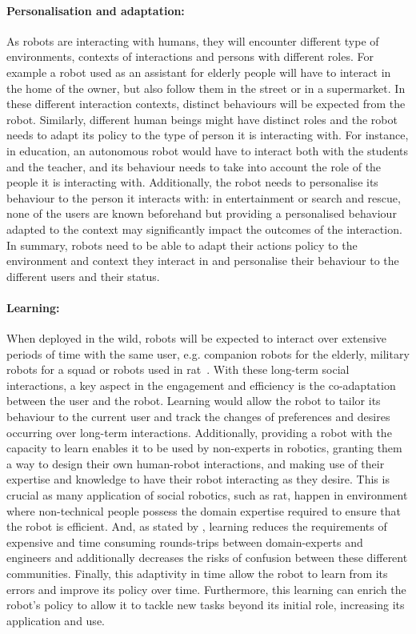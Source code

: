     \paragraph{Personalisation and adaptation: } As robots are interacting with humans, they will encounter different type of environments, contexts of interactions and persons with different roles. For example a robot used as an assistant for elderly people will have to interact in the home of the owner, but also follow them in the street or in a supermarket. In these different interaction contexts, distinct behaviours will be expected from the robot. Similarly, different human beings might have distinct roles and the robot needs to adapt its policy to the type of person it is interacting with. For instance, in education, an autonomous robot would have to interact both with the students and the teacher, and its behaviour needs to take into account the role of the people it is interacting with. Additionally, the robot needs to personalise its behaviour to the person it interacts with: in entertainment or search and rescue, none of the users are known beforehand but providing a personalised behaviour adapted to the context may significantly impact the outcomes of the interaction. In summary, robots need to be able to adapt their actions policy to the environment and context they interact in and personalise their behaviour to the different users and their status.

	\paragraph{Learning:} When deployed in the wild, robots will be expected to interact over extensive periods of time with the same user, e.g. companion robots for the elderly, military robots for a squad or robots used in \gls{rat}~\citep{leite2013social}. With these long-term social interactions, a key aspect in the engagement and efficiency is the co-adaptation between the user and the robot. Learning would allow the robot to tailor its behaviour to the current user and track the changes of preferences and desires occurring over long-term interactions. Additionally, providing a robot with the capacity to learn enables it to be used by non-experts in robotics, granting them a way to design their own human-robot interactions, and making use of their expertise and knowledge to have their robot interacting as they desire. This is crucial as many application of social robotics, such as \gls{rat}, happen in environment where non-technical people possess the domain expertise required to ensure that the robot is efficient. And, as stated by \cite{amershi2014power}, learning reduces the requirements of expensive and time consuming rounds-trips between domain-experts and engineers and additionally decreases the risks of confusion between these different communities. Finally, this adaptivity in time allow the robot to learn from its errors and improve its policy over time. Furthermore, this learning can enrich the robot's policy to allow it to tackle new tasks beyond its initial role, increasing its application and use.
	
